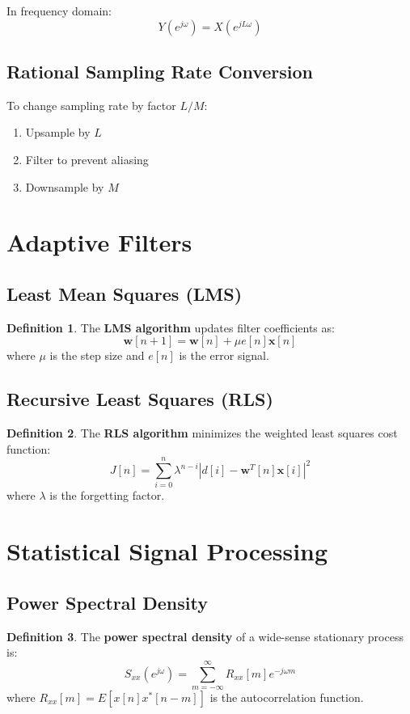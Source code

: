 \documentclass[11pt]{article}
\theoremstyle{definition}
\newtheorem{definition}{Definition}[section]
\begin{document}
In frequency domain:
$$Y(e^{j\omega}) = X(e^{jL\omega})$$

\subsection{Rational Sampling Rate Conversion}
To change sampling rate by factor $L/M$:
\begin{enumerate}
    \item Upsample by $L$
    \item Filter to prevent aliasing
    \item Downsample by $M$
\end{enumerate}

\section{Adaptive Filters}

\subsection{Least Mean Squares (LMS)}
\begin{definition}
The \textbf{LMS algorithm} updates filter coefficients as:
$$\mathbf{w}[n+1] = \mathbf{w}[n] + \mu e[n] \mathbf{x}[n]$$
where $\mu$ is the step size and $e[n]$ is the error signal.
\end{definition}

\subsection{Recursive Least Squares (RLS)}
\begin{definition}
The \textbf{RLS algorithm} minimizes the weighted least squares cost function:
$$J[n] = \sum_{i=0}^{n} \lambda^{n-i} |d[i] - \mathbf{w}^T[n] \mathbf{x}[i]|^2$$
where $\lambda$ is the forgetting factor.
\end{definition}

\section{Statistical Signal Processing}

\subsection{Power Spectral Density}
\begin{definition}
The \textbf{power spectral density} of a wide-sense stationary process is:
$$S_{xx}(e^{j\omega}) = \sum_{m=-\infty}^{\infty} R_{xx}[m] e^{-j\omega m}$$
where $R_{xx}[m] = E[x[n]x^*[n-m]]$ is the autocorrelation function.
\end{definition}
\end{document}

